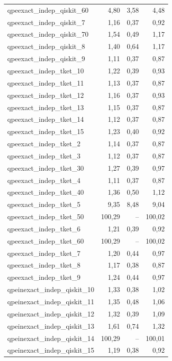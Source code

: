 \begin{longtable}{lrrr}
qpeexact\_indep\_qiskit\_60 & 4,80 & 3,58 & 4,48 \\
qpeexact\_indep\_qiskit\_7 & 1,16 & 0,37 & 0,92 \\
qpeexact\_indep\_qiskit\_70 & 1,54 & 0,49 & 1,17 \\
qpeexact\_indep\_qiskit\_8 & 1,40 & 0,64 & 1,17 \\
qpeexact\_indep\_qiskit\_9 & 1,11 & 0,37 & 0,87 \\
qpeexact\_indep\_tket\_10 & 1,22 & 0,39 & 0,93 \\
qpeexact\_indep\_tket\_11 & 1,13 & 0,37 & 0,87 \\
qpeexact\_indep\_tket\_12 & 1,16 & 0,37 & 0,93 \\
qpeexact\_indep\_tket\_13 & 1,15 & 0,37 & 0,87 \\
qpeexact\_indep\_tket\_14 & 1,12 & 0,37 & 0,87 \\
qpeexact\_indep\_tket\_15 & 1,23 & 0,40 & 0,92 \\
qpeexact\_indep\_tket\_2 & 1,14 & 0,37 & 0,87 \\
qpeexact\_indep\_tket\_3 & 1,12 & 0,37 & 0,87 \\
qpeexact\_indep\_tket\_30 & 1,27 & 0,39 & 0,97 \\
qpeexact\_indep\_tket\_4 & 1,11 & 0,37 & 0,87 \\
qpeexact\_indep\_tket\_40 & 1,36 & 0,50 & 1,12 \\
qpeexact\_indep\_tket\_5 & 9,35 & 8,48 & 9,04 \\
qpeexact\_indep\_tket\_50 & 100,29 & -- & 100,02 \\
qpeexact\_indep\_tket\_6 & 1,21 & 0,39 & 0,92 \\
qpeexact\_indep\_tket\_60 & 100,29 & -- & 100,02 \\
qpeexact\_indep\_tket\_7 & 1,20 & 0,44 & 0,97 \\
qpeexact\_indep\_tket\_8 & 1,17 & 0,38 & 0,87 \\
qpeexact\_indep\_tket\_9 & 1,24 & 0,44 & 0,97 \\
qpeinexact\_indep\_qiskit\_10 & 1,33 & 0,38 & 1,02 \\
qpeinexact\_indep\_qiskit\_11 & 1,35 & 0,48 & 1,06 \\
qpeinexact\_indep\_qiskit\_12 & 1,32 & 0,39 & 1,09 \\
qpeinexact\_indep\_qiskit\_13 & 1,61 & 0,74 & 1,32 \\
qpeinexact\_indep\_qiskit\_14 & 100,29 & -- & 100,01 \\
qpeinexact\_indep\_qiskit\_15 & 1,19 & 0,38 & 0,92 \\

\end{longtable}
